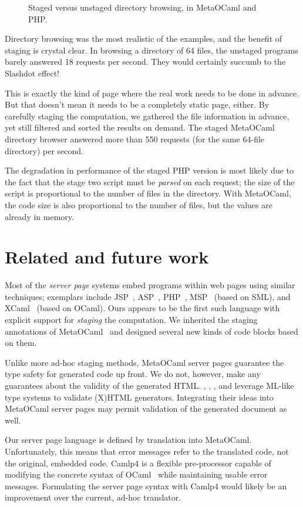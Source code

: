 \documentclass[preprint]{acm_proc_article-sp}
\def\MOC{MetaOCaml\xspace}
\newcommand{\myfig}[3]{%
  \begin{figure}[tbp]%
    #3%
    \caption{#2}%
    \label{fig:#1}%
  \end{figure}}
\newcommand{\gnuplot}[2]{%
  \myfig{#1}{#2}{}}
\begin{document}
\gnuplot{browse}{Staged versus unstaged directory browsing, in \MOC
  and PHP.}

Directory browsing was the most realistic of the examples, and the
benefit of staging is crystal clear.  In browsing a directory of 64
files, the unstaged programs barely answered 18 requests per second.
They would certainly succumb to the Slashdot effect!

This is exactly the kind of page where the real work needs to be done
in advance.  But that doesn't mean it needs to be a completely static
page, either.  By carefully staging the computation, we gathered the
file information in advance, yet still filtered and sorted the results
on demand.  The staged \MOC directory browser answered more than 550
requests (for the same 64-file directory) per second.

The degradation in performance of the staged PHP version is most
likely due to the fact that the stage two script must be \emph{parsed}
on each request; the size of the script is proportional to the number
of files in the directory.  With \MOC, the code size is also
proportional to the number of files, but the values are already in
memory.  

\section{Related and future work}
\label{sec:related}

Most of the \emph{server page} systems embed programs within web pages
using similar techniques; exemplars include JSP~\cite{sun-jsp},
ASP~\cite{microsoft-asp}, PHP~\cite{bakken04php},
MSP~\cite{elsman03web} (based on SML), and XCaml~\cite{baretta04xcaml}
(based on OCaml).  Ours appears to be the first such language with
explicit support for \emph{staging} the computation.  We inherited the
staging annotations of \MOC~\cite{calcagno03meta} and designed several
new kinds of code blocks based on them.

Unlike more ad-hoc staging methods, \MOC server pages guarantee the
type safety for generated code up front.  We do not, however, make any
guarantees about the validity of the generated HTML.
\citet{elsman04typing}, \citet{wallace99haxml}, \citet{hosoya03xduce},
and \citet{ohl04xhtml} leverage ML-like type systems to validate
(X)HTML generators.  Integrating their ideas into \MOC server pages
may permit validation of the generated document as well.

Our server page language is defined by translation into \MOC.
Unfortunately, this means that error messages refer to the translated
code, not the original, embedded code.  Camlp4 is a flexible
pre-processor capable of modifying the concrete syntax of
OCaml~\cite{rauglaudre03camlp4} while maintaining usable error
messages.  Formulating the server page syntax with Camlp4 would likely
be an improvement over the current, ad-hoc translator.
\end{document}
